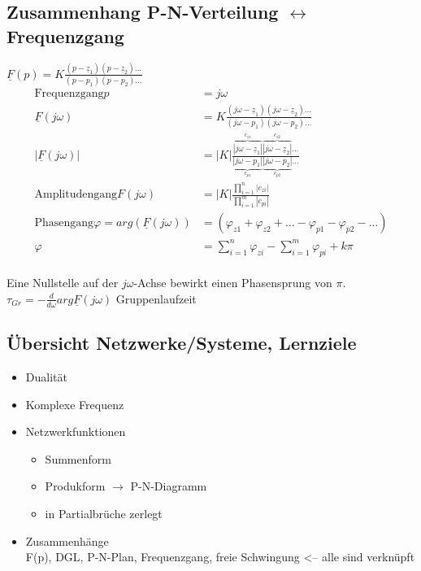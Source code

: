 \subsection{Zusammenhang P-N-Verteilung $\leftrightarrow$ Frequenzgang}
$\underline{F}(p)=K\frac{(p-\underline{z}_1)(p-\underline{z}_2)\ldots}{(p-p_1)(p-p_2)\ldots}$\\
\begin{align}
	\text{Frequenzgang} p&=j\omega\nonumber\\
	\underline{F}(j\omega)&=K\frac{(j\omega-\underline{z}_1)(j\omega-\underline{z}_2)\ldots}{(j\omega-p_1)(j\omega-p_2)\ldots}\nonumber\\
	|\underline{F}(j\omega)|&=|K|\frac{\overbrace{|j\omega-\underline{z}_1|}^{c_{z1}}\overbrace{|j\omega-\underline{z}_2|}^{c_{z2}}\ldots}{\underbrace{|j\omega-p_1|}_{c_{p1}}\underbrace{|j\omega-p_2|}_{c_{p2}}\ldots}\nonumber\\
	\text{Amplitudengang}F(j\omega)&=|K|\frac{\prod_{i=1}^{n}|c_{zi}|}{\prod_{i=1}^{m}|c_{pi}|} \nonumber\\
	\text{Phasengang}\varphi =
arg\left(\underline{F}(j\omega)\right)&=\left(\varphi_{z1}+\varphi_{z2}+\ldots-\varphi_{p1}-\varphi_{p2}-\ldots\right)\nonumber\\
	\varphi &= \sum_{i=1}^n\varphi_{zi}-\sum_{i=1}^m\varphi_{pi}+k\pi\nonumber
\end{align}\\
Eine Nullstelle auf der $j\omega$-Achse bewirkt einen Phasensprung von $\pi$.\\
$\tau_{Gr}=-\frac{d}{d\omega}arg\underline{F}(j\omega)$ Gruppenlaufzeit\\
\subsection{Übersicht Netzwerke/Systeme, Lernziele}
\begin{itemize}
  \item Dualität
  \item Komplexe Frequenz
  \item Netzwerkfunktionen
  \begin{itemize}
    \item Summenform
    \item Produkform $\rightarrow$ P-N-Diagramm
    \item in Partialbrüche zerlegt
	\end{itemize}
	\item Zusammenhänge\\
	F(p), DGL, P-N-Plan, Frequenzgang, freie Schwingung <-- alle sind verknüpft
\end{itemize}	